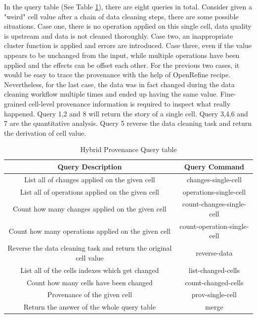 In the query table (See Table \ref{tab:hybrid_prov}), there are eight queries in total. Consider given a "weird" cell value after a chain of data cleaning steps, there are some possible situations. Case one, there is no operation applied on this single cell, data quality is upstream and data is not cleaned thoroughly. Case two, an inappropriate cluster function is applied and errors are introduced. Case three, even if the value appears to be unchanged from the input, while multiple operations have been applied and the effects can be offset each other. For the previous two cases, it would be easy to trace the provenance with the help of OpenRefine recipe. Nevertheless, for the last case, the data was in fact changed during the data cleaning workflow multiple times and ended up having the same value. Fine-grained cell-level provenance information is required to inspect what really happened. Query 1,2 and 8 will return the story of a single cell. Query 3,4,6 and 7 are the quantitative analysis. Query 5 reverse the data cleaning task and return the derivation of cell value. 



\begin{table}
    \centering
    \begin{tabular}{c|c}
    \hline
    \textbf{Query Description} & \textbf{Query Command} \\
    \hline
    List all of changes applied on the given cell & changes-single-cell \\
    \hline
    List all of operations applied on the given cell & operations-single-cell \\
    \hline
    Count how many changes applied on the given cell & count-changes-single-cell \\
    \hline
    Count how many operations applied on the given cell & count-operation-single-cell \\
    \hline
    Reverse the data cleaning task and return the original cell value & reverse-data \\
    \hline
    List all of the cells indexes which get changed & list-changed-cells \\
    \hline
    Count how many cells have been changed & count-changed-cells \\
    \hline
    Provenance of the given cell & prov-single-cell \\
    \hline
    Return the answer of the whole query table & merge \\
    \hline
    \end{tabular}
    \caption{Hybrid Provenance Query table}
    \label{tab:hybrid_prov}
\end{table}


